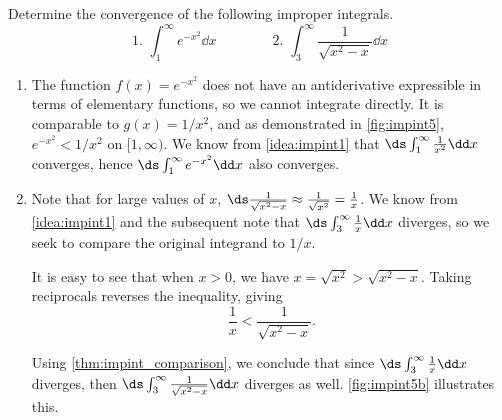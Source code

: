 \begin{example}\label{ex_impint5}
Determine the convergence of the following improper integrals.
\[
 \text{1. }\int_1^\infty e^{-x^2}\dd x\qquad\qquad
 \text{2. }\int_3^\infty \frac{1}{\sqrt{x^2-x}}\dd x
\]
\solution
\begin{enumerate}
\item		The function $f(x) = e^{-x^2}$ does not have an antiderivative expressible in terms of elementary functions, so we cannot integrate directly. It is comparable to $g(x)=1/x^2$, and as demonstrated in \autoref{fig:impint5}, $e^{-x^2} < 1/x^2$ on $[1,\infty)$. We know from \autoref{idea:impint1} that $\ds \int_1^\infty \frac{1}{x^2}\dd x$ converges, hence $\ds\int_1^\infty e^{-x^2}\dd x$ also converges.


\item		Note that for large values of $x$, $\ds \frac{1}{\sqrt{x^2-x}} \approx \frac{1}{\sqrt{x^2}} =\frac{1}{x}$. We know from \autoref{idea:impint1} and the subsequent note that  $\ds \int_3^\infty \frac1x\dd x$ diverges, so we seek to compare the original integrand to $1/x$.

It is easy to see that when $x>0$, we have $x = \sqrt{x^2} > \sqrt{x^2-x}$. Taking reciprocals reverses the inequality, giving
\[\frac1x < \frac1{\sqrt{x^2-x}}.\]

Using \autoref{thm:impint_comparison}, we conclude that since $\ds\int_3^\infty\frac1x\dd x$ diverges, then $\ds\int_3^\infty\frac1{\sqrt{x^2-x}}\dd x$ diverges as well. \autoref{fig:impint5b} illustrates this.


\end{enumerate}
\end{example}
